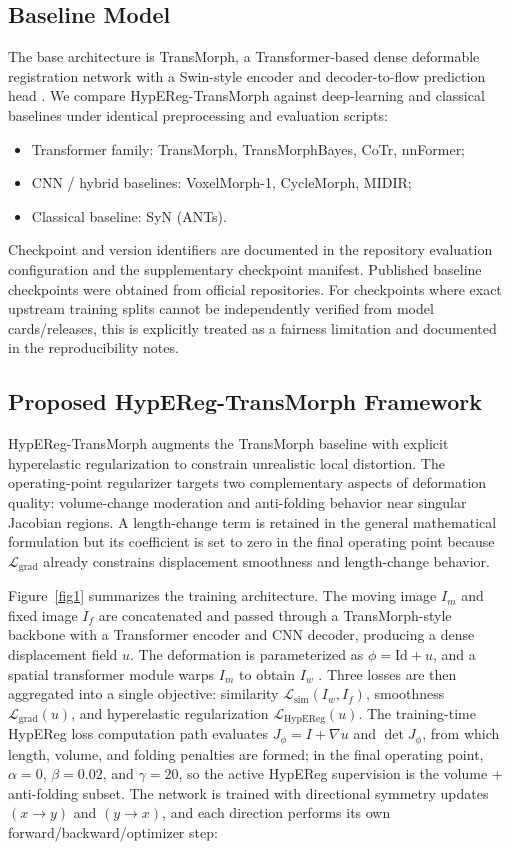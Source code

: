 \documentclass[11pt,a4paper]{article}
\begin{document}
\subsection{Baseline Model}
The base architecture is TransMorph, a Transformer-based dense deformable registration network with a Swin-style encoder and decoder-to-flow prediction head \citep{chen2022transmorph,liu2021swin}. We compare HypEReg-TransMorph against deep-learning and classical baselines under identical preprocessing and evaluation scripts:
\begin{itemize}
\item Transformer family: TransMorph, TransMorphBayes, CoTr, nnFormer;
\item CNN / hybrid baselines: VoxelMorph-1, CycleMorph, MIDIR;
\item Classical baseline: SyN (ANTs).
\end{itemize}
Checkpoint and version identifiers are documented in the repository evaluation configuration and the supplementary checkpoint manifest.
Published baseline checkpoints were obtained from official repositories. For checkpoints where exact upstream training splits cannot be independently verified from model cards/releases, this is explicitly treated as a fairness limitation and documented in the reproducibility notes.

\subsection{Proposed HypEReg-TransMorph Framework}
HypEReg-TransMorph augments the TransMorph baseline with explicit hyperelastic regularization to constrain unrealistic local distortion. The operating-point regularizer targets two complementary aspects of deformation quality: volume-change moderation and anti-folding behavior near singular Jacobian regions. A length-change term is retained in the general mathematical formulation but its coefficient is set to zero in the final operating point because \(\mathcal{L}_{\mathrm{grad}}\) already constrains displacement smoothness and length-change behavior.

Figure~\ref{fig1} summarizes the training architecture. The moving image \(I_m\) and fixed image \(I_f\) are concatenated and passed through a TransMorph-style backbone with a Transformer encoder and CNN decoder, producing a dense displacement field \(u\). The deformation is parameterized as \(\phi=\mathrm{Id}+u\), and a spatial transformer module warps \(I_m\) to obtain \(I_w\) \citep{jaderberg2015stn}. Three losses are then aggregated into a single objective: similarity \(\mathcal{L}_{\mathrm{sim}}(I_w,I_f)\), smoothness \(\mathcal{L}_{\mathrm{grad}}(u)\), and hyperelastic regularization \(\mathcal{L}_{\mathrm{HypEReg}}(u)\). The training-time HypEReg loss computation path evaluates \(J_\phi=I+\nabla u\) and \(\det J_\phi\), from which length, volume, and folding penalties are formed; in the final operating point, \(\alpha=0\), \(\beta=0.02\), and \(\gamma=20\), so the active HypEReg supervision is the volume + anti-folding subset. The network is trained with directional symmetry updates \((x\rightarrow y)\) and \((y\rightarrow x)\), and each direction performs its own forward/backward/optimizer step:
\end{document}
